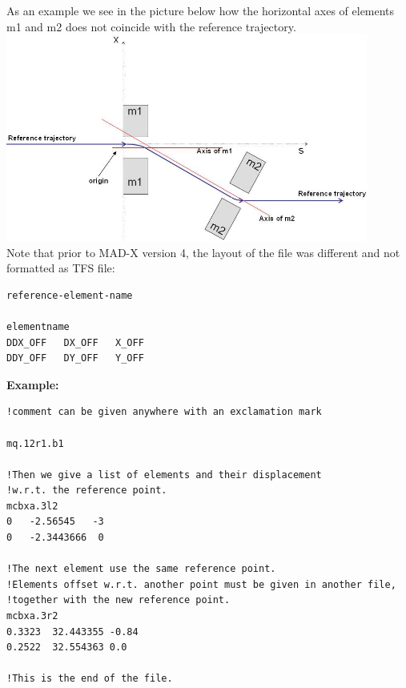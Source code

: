 As an example we see in the picture below how the horizontal axes of elements m1 and m2 
does not coincide with the reference trajectory.
\\
\includegraphics[width=450px]{Introduction/offsetelem.jpg}
\\ 

Note that prior to MAD-X version 4, the layout of the file was different and not formatted as TFS file:

\begin{verbatim}
reference-element-name

elementname
DDX_OFF   DX_OFF   X_OFF
DDY_OFF   DY_OFF   Y_OFF
\end{verbatim} 

{\bf Example:} 
\begin{verbatim}
!comment can be given anywhere with an exclamation mark

mq.12r1.b1

!Then we give a list of elements and their displacement 
!w.r.t. the reference point.
mcbxa.3l2
0   -2.56545   -3
0   -2.3443666  0

!The next element use the same reference point.
!Elements offset w.r.t. another point must be given in another file,
!together with the new reference point.
mcbxa.3r2
0.3323  32.443355 -0.84
0.2522  32.554363 0.0

!This is the end of the file.
\end{verbatim}



